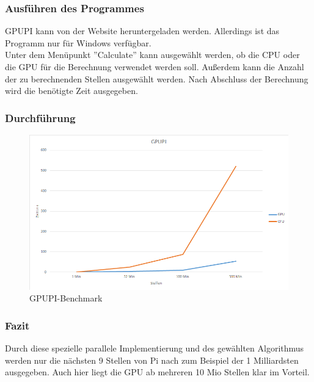 \subsubsection{Ausführen des Programmes}
GPUPI kann von der Website heruntergeladen werden. \cite{gpupi} Allerdings ist das Programm nur für Windows verfügbar.\\
Unter dem Menüpunkt ''Calculate'' kann ausgewählt werden, ob die CPU oder die GPU für die Berechnung verwendet werden soll. Außerdem kann die Anzahl der zu berechnenden Stellen ausgewählt werden. Nach Abschluss der Berechnung wird die benötigte Zeit ausgegeben.
\subsubsection{Durchführung}
\begin{figure}[!h]
	\begin{center}
		\includegraphics[width=17cm]{images/gpupi.png}
		\caption{GPUPI-Benchmark}
	\end{center}
\end{figure}
\newpage
\subsubsection{Fazit}
Durch diese spezielle parallele Implementierung und des gewählten Algorithmus werden nur die nächsten 9 Stellen von Pi nach zum Beispiel der 1 Milliardsten ausgegeben. Auch hier liegt die GPU ab mehreren 10 Mio Stellen klar im Vorteil.